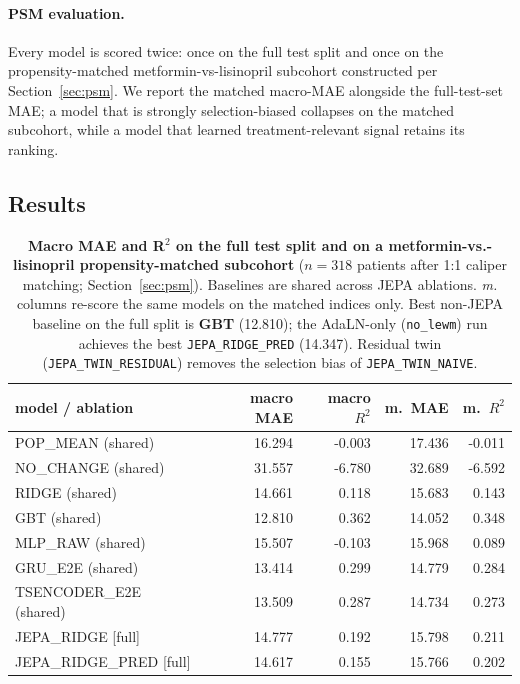 \paragraph{PSM evaluation.} Every model is scored twice: once on the full
test split and once on the propensity-matched metformin-vs-lisinopril
subcohort constructed per Section~\ref{sec:psm}. We report the matched
macro-MAE alongside the full-test-set MAE; a model that is strongly
selection-biased collapses on the matched subcohort, while a model that
learned treatment-relevant signal retains its ranking.

\subsection{Results}

\begin{table}[H]
\centering
\scriptsize
\setlength{\tabcolsep}{4pt}
\caption{\textbf{Macro MAE and R$^2$ on the full test split and on a
metformin-vs.-lisinopril propensity-matched subcohort} ($n{=}318$
patients after 1:1 caliper matching; Section~\ref{sec:psm}). Baselines
are shared across JEPA ablations. \emph{m.} columns re-score the same
models on the matched indices only. Best non-JEPA baseline on the full
split is \textbf{GBT} (12.810); the AdaLN-only (\texttt{no\_lewm}) run
achieves the best \texttt{JEPA\_RIDGE\_PRED} (14.347). Residual twin
(\texttt{JEPA\_TWIN\_RESIDUAL}) removes the selection bias of
\texttt{JEPA\_TWIN\_NAIVE}.}
\label{tab:outcome_main}
\begin{tabular}{lrrrr}
\toprule
model / ablation & macro MAE & macro $R^2$ & m.\ MAE & m.\ $R^2$ \\
\midrule
POP\_MEAN (shared) & 16.294 & -0.003 & 17.436 & -0.011 \\
NO\_CHANGE (shared) & 31.557 & -6.780 & 32.689 & -6.592 \\
RIDGE (shared) & 14.661 & 0.118 & 15.683 & 0.143 \\
GBT (shared) & 12.810 & 0.362 & 14.052 & 0.348 \\
MLP\_RAW (shared) & 15.507 & -0.103 & 15.968 & 0.089 \\
GRU\_E2E (shared) & 13.414 & 0.299 & 14.779 & 0.284 \\
TSENCODER\_E2E (shared) & 13.509 & 0.287 & 14.734 & 0.273 \\
\midrule
JEPA\_RIDGE [full] & 14.777 & 0.192 & 15.798 & 0.211 \\
JEPA\_RIDGE\_PRED [full] & 14.617 & 0.155 & 15.766 & 0.202 \\

\end{tabular}
\end{table}

